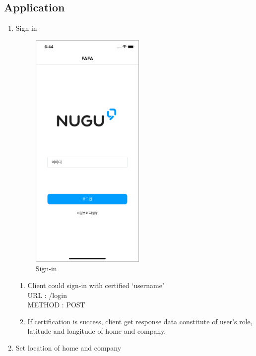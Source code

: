 \documentclass[conference]{IEEEtran}
\begin{document}
\subsection{Application}
\begin{enumerate}
    \item Sign-in
    \begin{figure}[htbp]
    \centerline{\includegraphics{images/f1.png}}
    \caption{Sign-in}
    \end{figure}
    \begin{enumerate}
        \item Client could sign-in with certified ‘username’\\
        URL : /login\\
	    METHOD : POST\\
        \item If certification is success, client get response data constitute of user’s role, latitude and longitude of home and company.\\
    \end{enumerate}
    \item Set location of home and company
    \begin{figure}[htbp]

\end{figure}
\end{enumerate}
\end{document}
